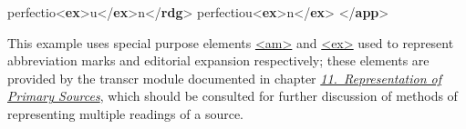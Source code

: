 \begin{shaded}
\hspace*{1em}\hspace*{1em}\mbox{}\newline 
\hspace*{1em}\mbox{}\newline 
{}\mbox{}\newline 
{}perfectio{<\textbf{ex}>}u{</\textbf{ex}>}n{</\textbf{rdg}>}\mbox{}\newline 
{}perfectiou{<\textbf{ex}>}n{</\textbf{ex}>}\mbox{}\newline 
{}\mbox{}\newline 
{</\textbf{app}>}\end{shaded}\egroup\par \noindent  This example uses special purpose elements \hyperref[TEI.am]{<am>} and \hyperref[TEI.ex]{<ex>} used to represent abbreviation marks and editorial expansion respectively; these elements are provided by the \textsf{transcr} module documented in chapter \textit{\hyperref[PH]{11.\ Representation of Primary Sources}}, which should be consulted for further discussion of methods of representing multiple readings of a source. \par
